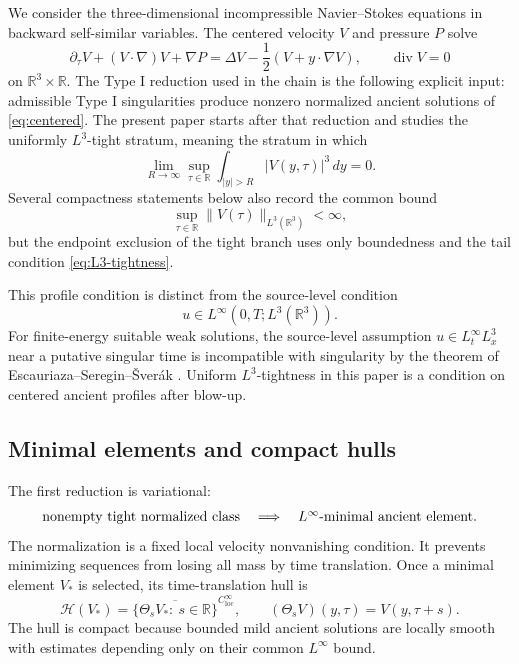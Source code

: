 \documentclass[11pt]{amsart}
\theoremstyle{plain}
\theoremstyle{definition}
\theoremstyle{remark}
\numberwithin{equation}{section}
\newcommand{\R}{\mathbb R}
\newcommand{\loc}{\mathrm{loc}}
\newcommand{\divergence}{\operatorname{div}}
\newcommand{\calH}{\mathcal H}
\begin{document}
We consider the three-dimensional incompressible Navier--Stokes equations in
backward self-similar variables.  The centered velocity \(V\) and pressure \(P\)
solve
\begin{equation}\label{eq:centered}
   \partial_\tau V+(V\cdot\nabla)V+\nabla P
   =
   \Delta V-\frac12(V+y\cdot\nabla V),
   \qquad \divergence V=0
\end{equation}
on \(\R^3\times\R\).  The Type I reduction used in the chain is the following
explicit input: admissible Type I singularities produce nonzero normalized
ancient solutions of \eqref{eq:centered}.  The present paper starts after that
reduction and studies the uniformly \(L^3\)-tight stratum, meaning
the stratum in which
\begin{equation}\label{eq:L3-tightness}
   \lim_{R\to\infty}
   \sup_{\tau\in\R}\int_{|y|>R}|V(y,\tau)|^3\,dy=0 .
\end{equation}
Several compactness statements below also record the common bound
\begin{equation}\label{eq:L3-bound}
   \sup_{\tau\in\R}\|V(\tau)\|_{L^3(\R^3)}<\infty ,
\end{equation}
but the endpoint exclusion of the tight branch uses only boundedness and the
tail condition \eqref{eq:L3-tightness}.

This profile condition is distinct from the source-level condition
\[
   u\in L^\infty(0,T;L^3(\R^3)).
\]
For finite-energy suitable weak solutions, the source-level assumption
\(u\in L^\infty_tL^3_x\) near a putative singular time is incompatible with
singularity by the theorem of Escauriaza--Seregin--\v{S}ver\'ak
\cite{ESS2003}.  Uniform \(L^3\)-tightness in this paper is a condition on
centered ancient profiles after blow-up.

\subsection{Minimal elements and compact hulls}

The first reduction is variational:
\[
   \hbox{nonempty tight normalized class}
   \quad\Longrightarrow\quad
   \hbox{\(L^\infty\)-minimal ancient element}.
\]
The normalization is a fixed local velocity nonvanishing condition.  It
prevents minimizing sequences from losing all mass by time translation.
Once a minimal element \(V_*\) is selected, its time-translation hull is
\[
   \calH(V_*)
   =
   \overline{\{\Theta_sV_*:\ s\in\R\}}^{C^\infty_{\loc}},
   \qquad
   (\Theta_sV)(y,\tau)=V(y,\tau+s).
\]
The hull is compact because bounded mild ancient solutions are locally smooth
with estimates depending only on their common \(L^\infty\) bound.
\end{document}
